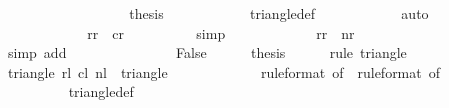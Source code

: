 \begin{isabellebody}
\ \ \ \ \ \ \ \ \isamarkupfalse%
\isanewline
\ \ \ \ \ \ \ \ \isamarkupfalse%
\ {\isacharquery}thesis\isanewline
\ \ \ \ \ \ \ \ \ \ \isamarkupfalse%
\ triangle{\isacharunderscore}def\isanewline
\ \ \ \ \ \ \ \ \ \ \isamarkupfalse%
\ auto\isanewline
\ \ \ \ \ \ \isamarkupfalse%
\isanewline
\ \ \ \ \isamarkupfalse%
\isanewline
\ \ \ \ \ \ \isamarkupfalse%
\ {\isachardoublequoteopen}{\isacharquery}r{}r\ {\isasymle}\ {\isacharquery}c{}r{\isachardoublequoteclose}\isanewline
\ \ \ \ \ \ \ \ \isamarkupfalse%
\ simp\isanewline
\ \ \ \ \isamarkupfalse%
\isanewline
\ \ \ \ \ \ \isamarkupfalse%
\ {\isachardoublequoteopen}{\isacharquery}r{}r\ {\isacharplus}\ {\isacharquery}nr\ {\isasymle}\ {}{}{}{}{\isachardoublequoteclose}\isanewline
\ \ \ \ \ \ \ \ \isamarkupfalse%
\ {\isacharparenleft}simp\ add{\isacharcolon}\ {\isachardoublequoteopen}{\isacharasterisk}{\isachardoublequoteclose}{\isacharparenleft}{}{\isacharparenright}\ {\isachardoublequoteopen}{\isacharasterisk}{\isachardoublequoteclose}{\isacharparenleft}{}{\isacharparenright}{\isacharparenright}\isanewline
\ \ \ \ \isamarkupfalse%
\isanewline
\ \ \isamarkupfalse%
\isanewline
\ \ \ \ \isamarkupfalse%
\ False\isanewline
\ \ \ \ \isamarkupfalse%
\ {\isacharquery}thesis\isanewline
\ \ \ \ \isamarkupfalse%
\ {\isacharparenleft}rule\ triangle{\isacharparenright}\isanewline
\ \ \ \ \ \ \isamarkupfalse%
\ {\isachardoublequoteopen}triangle\ {\isacharquery}r{}l\ {\isacharquery}c{}l\ {\isacharquery}nl\ {\isasymsubseteq}\ triangle\ {}\ {}\ {}{}{}{}{\isachardoublequoteclose}\isanewline
\ \ \ \ \ \ \ \ \isamarkupfalse%
\ {\isacharasterisk}{\isacharparenleft}{}{\isacharparenright}{\isacharbrackleft}rule{\isacharunderscore}format{\isacharcomma}\ of\ {}{}{}{}{\isacharbrackright}\ {\isacharasterisk}{\isacharparenleft}{}{\isacharparenright}{\isacharbrackleft}rule{\isacharunderscore}format{\isacharcomma}\ of\ {}{}{}{}{\isacharbrackright}\isanewline
\ \ \ \ \ \ \ \ \isamarkupfalse%
\ triangle{\isacharunderscore}def\isanewline

\end{isabellebody}
